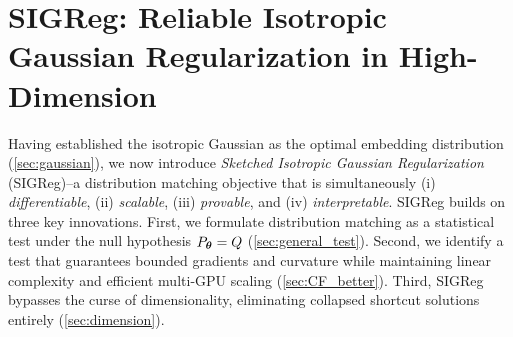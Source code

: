 








\section{SIGReg: Reliable Isotropic Gaussian Regularization in High-Dimension}
\label{sec:bcs}
Having established the isotropic Gaussian as the optimal embedding distribution 
(\cref{sec:gaussian}), we now introduce {\em Sketched Isotropic Gaussian 
Regularization} (SIGReg)--a distribution matching objective that is simultaneously 
(i) {\em differentiable}, (ii) {\em scalable}, (iii) {\em provable}, and 
(iv) {\em interpretable}. SIGReg builds on three key innovations. First, we 
formulate distribution matching as a statistical test under the null hypothesis 
$P_{{\bm{\theta}}}=Q$ (\cref{sec:general_test}). Second, we identify a test that 
guarantees bounded gradients and curvature while maintaining linear complexity 
and efficient multi-GPU scaling (\cref{sec:CF_better}). Third, SIGReg bypasses 
the curse of dimensionality, eliminating collapsed shortcut solutions entirely 
(\cref{sec:dimension}).


